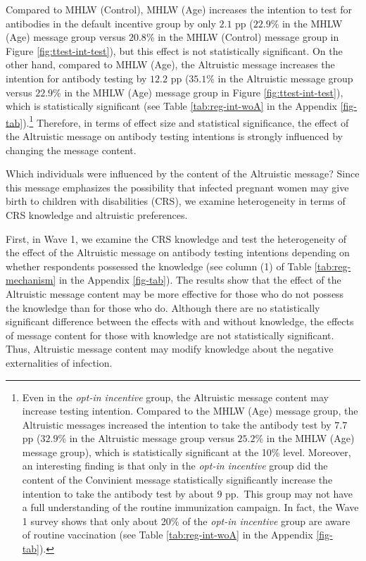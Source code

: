 \documentclass[
]{article}
\begin{document}
Compared to MHLW (Control), MHLW (Age) increases the intention to test for antibodies in the default incentive group by only \(2.1\) pp (\(22.9\)\% in the MHLW (Age) message group versus \(20.8\)\% in the MHLW (Control) message group in Figure \ref{fig:ttest-int-test}), but this effect is not statistically significant. On the other hand, compared to MHLW (Age), the Altruistic message increases the intention for antibody testing by \(12.2\) pp (\(35.1\)\% in the Altruistic message group versus \(22.9\)\% in the MHLW (Age) message group in Figure \ref{fig:ttest-int-test}), which is statistically significant (see Table \ref{tab:reg-int-woA} in the Appendix \ref{fig-tab}).\footnote{Even in the \emph{opt-in incentive} group, the Altruistic message content may increase testing intention. Compared to the MHLW (Age) message group, the Altruistic messages increased the intention to take the antibody test by \(7.7\) pp (\(32.9\)\% in the Altruistic message group versus \(25.2\)\% in the MHLW (Age) message group), which is statistically significant at the 10\% level. Moreover, an interesting finding is that only in the \emph{opt-in incentive} group did the content of the Convinient message statistically significantly increase the intention to take the antibody test by about 9 pp.~This group may not have a full understanding of the routine immunization campaign. In fact, the Wave 1 survey shows that only about 20\% of the \emph{opt-in incentive} group are aware of routine vaccination (see Table \ref{tab:reg-int-woA} in the Appendix \ref{fig-tab}).} Therefore, in terms of effect size and statistical significance, the effect of the Altruistic message on antibody testing intentions is strongly influenced by changing the message content.

Which individuals were influenced by the content of the Altruistic message? Since this message emphasizes the possibility that infected pregnant women may give birth to children with disabilities (CRS), we examine heterogeneity in terms of CRS knowledge and altruistic preferences.

First, in Wave 1, we examine the CRS knowledge and test the heterogeneity of the effect of the Altruistic message on antibody testing intentions depending on whether respondents possessed the knowledge (see column (1) of Table \ref{tab:reg-mechanism} in the Appendix \ref{fig-tab}). The results show that the effect of the Altruistic message content may be more effective for those who do not possess the knowledge than for those who do. Although there are no statistically significant difference between the effects with and without knowledge, the effects of message content for those with knowledge are not statistically significant. Thus, Altruistic message content may modify knowledge about the negative externalities of infection.
\end{document}
